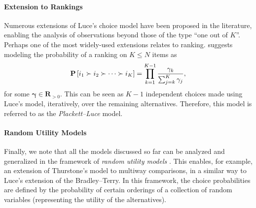 \paragraph{Extension to Rankings}
Numerous extensions of Luce's choice model have been proposed in the literature, enabling the analysis of observations beyond those of the type ``one out of $K$''.
Perhaps one of the most widely-used extensions relates to ranking.
\citet{plackett1975analysis} suggests modeling the probability of a ranking on $K \le N$ items as
\begin{align*}
\mathbf{P}\left[ i_1 \succ i_2 \succ \cdots \succ i_K \right] = \prod_{k = 1}^{K - 1} \frac{\gamma_k}{\sum_{j = k}^K \gamma_j},
\end{align*}
for some $\bm{\gamma} \in \mathbf{R}_{>0}$.
This can be seen as $K-1$ independent choices made using Luce's model, iteratively, over the remaining alternatives.
Therefore, this model is referred to as the \emph{Plackett--Luce} model.

\paragraph{Random Utility Models}
Finally, we note that all the models discussed so far can be analyzed and generalized in the framework of \emph{random utility models} \citep{train2009discrete}.
This enables, for example, an extension of Thurstone's model to multiway comparisons, in a similar way to Luce's extension of the Bradley--Terry.
In this framework, the choice probabilities are defined by the probability of certain orderings of a collection of random variables (representing the utility of the alternatives).

